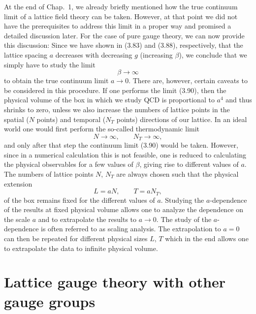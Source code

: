 At the end of Chap.~1, we already briefly mentioned how the true continuum
limit of a lattice field theory can be taken. However, at that point we did not
have the prerequisites to address this limit in a proper way and promised a
detailed discussion later. For the case of pure gauge theory, we can now provide
this discussion: Since we have shown in (3.83) and (3.88), respectively, that
the lattice spacing $a$ decreases with decreasing $g$ (increasing $\beta$), we
conclude that we simply have to study the limit
\begin{equation}
  \beta \to \infty
\end{equation}
to obtain the true continuum limit $a \to 0$. There are, however, certain
caveats to be considered in this procedure. If one performs the limit (3.90),
then the physical volume of the box in which we study QCD is proportional to
$a^4$ and thus shrinks to zero, unless we also increase the numbers of lattice
points in the spatial ($N$ points) and temporal ($N_T$ points) directions of
our lattice. In an ideal world one would first perform the so-called
thermodynamic limit
\begin{equation}
  N \to \infty , \qquad N_T \to \infty ,
\end{equation}
and only after that step the continuum limit (3.90) would be taken. However,
since in a numerical calculation this is not feasible, one is reduced to
calculating the physical observables for a few values of $\beta$, giving rise to
different values of $a$. The numbers of lattice points $N$, $N_T$ are always
chosen such that the physical extension
\begin{equation}
  L = a N , \qquad T = a N_T ,
\end{equation}
of the box remains fixed for the different values of $a$. Studying the
$a$-dependence of the results at fixed physical volume allows one to analyze
the dependence on the scale $a$ and to extrapolate the results to $a \to 0$.
The study of the $a$-dependence is often referred to as scaling analysis. The
extrapolation to $a = 0$ can then be repeated for different physical sizes $L$,
$T$ which in the end allows one to extrapolate the data to infinite physical
volume.

\section{Lattice gauge theory with other gauge groups}

